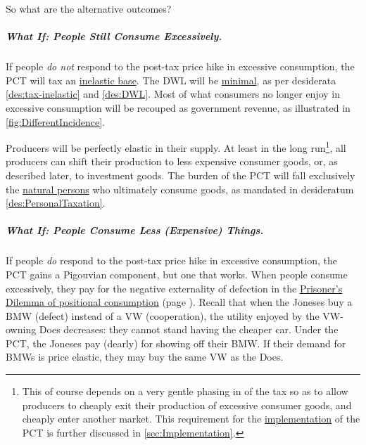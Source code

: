 So what are the alternative outcomes?

\subparagraph{What If: People Still Consume Excessively.} If people \emph{do not} respond to the post-tax price hike in excessive consumption, the PCT will tax an \hyperref[des:tax-inelastic]{inelastic base}. The DWL will be \hyperref[des:DWL]{minimal}, as per desiderata \ref{des:tax-inelastic} and \ref{des:DWL}. Most of what consumers no longer enjoy in excessive consumption will be recouped as government revenue, as illustrated in \autoref{fig:DifferentIncidence}.

Producers will be perfectly elastic in their supply. At least in the long run\footnote{This of course depends on a very gentle phasing in of the tax so as to allow producers to cheaply exit their production of excessive consumer goods, and cheaply enter another market. This requirement for the \hyperref[sec:Implementation]{implementation} of the PCT is further discussed in \autoref{sec:Implementation}.}, all producers can shift their production to less expensive consumer goods, or, as described later, to investment goods. The burden of the PCT will fall exclusively the \hyperref[des:PersonalTaxation]{natural persons} who ultimately consume goods, as mandated in desideratum \ref{des:PersonalTaxation}.

\subparagraph{What If: People Consume Less (Expensive) Things.} If people \emph{do} respond to the post-tax price hike in excessive consumption, the PCT gains a Pigouvian component, but one that works. When people consume excessively, they pay for the negative externality of defection in the \hyperref[tab:PositionalPD]{Prisoner's Dilemma of positional consumption} (page \pageref{tab:PositionalPD}). Recall that when the Joneses buy a BMW (defect) instead of a VW (cooperation), the utility enjoyed by the VW-owning Does decreases: they cannot stand having the cheaper car. Under the PCT, the Joneses pay (dearly) for showing off their BMW. If their demand for BMWs is price elastic, they may buy the same VW as the Does.

